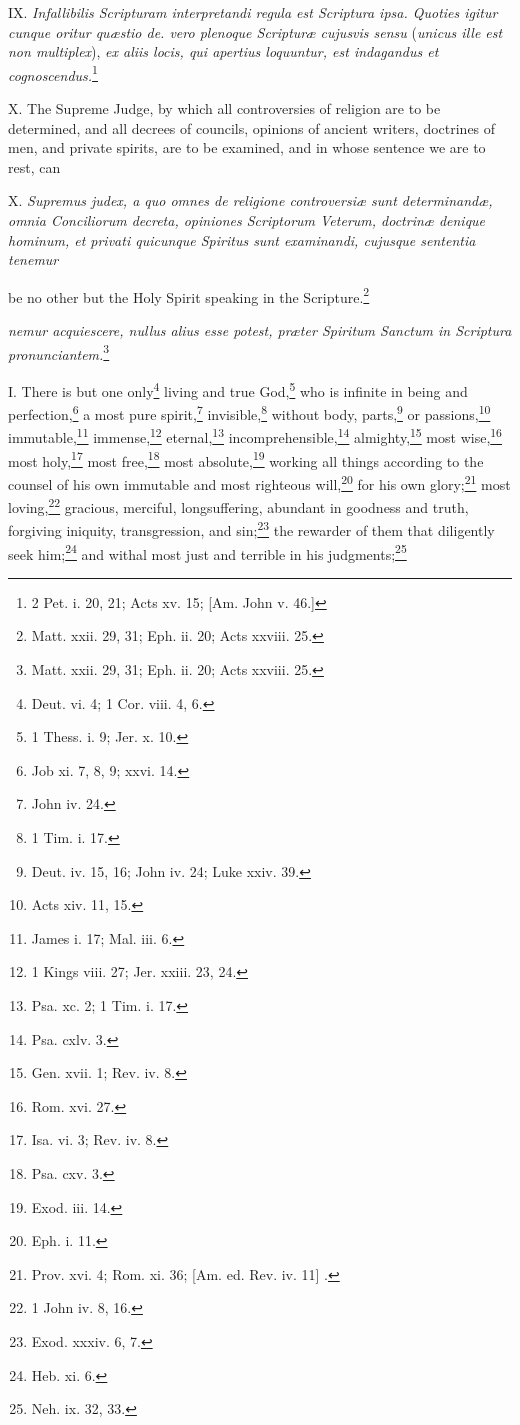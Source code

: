 IX. \emph{Infallibilis Scripturam interpretandi regula est Scriptura ipsa. Quoties igitur cunque oritur quæstio de. vero plenoque Scripturæ cujusvis sensu} (\emph{unicus ille est non multiplex}), \emph{ex aliis locis, qui apertius loquuntur, est indagandus et cognoscendus.}\footnote{2 Pet. i. 20, 21; Acts xv. 15; [Am.  John v. 46.]}

X. The Supreme Judge, by which all controversies of religion are to be determined, and all decrees of councils, opinions of ancient writers, doctrines of men, and private spirits, are to be examined, and in whose sentence we are to rest, can

X. \emph{Supremus judex, a quo omnes de religione controversiæ sunt determinandæ, omnia Conciliorum decreta, opiniones Scriptorum Veterum, doctrinæ denique hominum, et privati quicunque Spiritus sunt examinandi, cujusque sententia tenemur}

be no other but the Holy Spirit speaking in the Scripture.\footnote{Matt. xxii. 29, 31;  Eph. ii. 20; Acts xxviii. 25.}

\emph{nemur acquiescere, nullus alius esse potest, præter Spiritum Sanctum in Scriptura pronunciantem.}\footnote{Matt. xxii. 29, 31; Eph. ii. 20; Acts xxviii. 25.}


I. There is but one only\footnote{Deut. vi. 4;  1 Cor. viii. 4, 6.} living and true God,\footnote{1 Thess. i. 9; Jer. x. 10.} who is infinite in being and perfection,\footnote{Job xi. 7, 8, 9; xxvi. 14.} a most pure spirit,\footnote{John iv. 24.} invisible,\footnote{1 Tim. i. 17.} without body, parts,\footnote{Deut. iv. 15, 16; John iv. 24; Luke xxiv. 39.} or passions,\footnote{Acts xiv. 11, 15.} immutable,\footnote{James i. 17;  Mal. iii. 6.} immense,\footnote{1 Kings viii. 27;  Jer. xxiii. 23, 24.} eternal,\footnote{Psa. xc. 2;  1 Tim. i. 17.} incomprehensible,\footnote{Psa. cxlv. 3.} almighty,\footnote{Gen. xvii. 1;  Rev. iv. 8.} most wise,\footnote{Rom. xvi. 27.} most holy,\footnote{Isa. vi. 3; Rev. iv. 8.} most free,\footnote{Psa. cxv. 3.} most absolute,\footnote{Exod. iii. 14.} working all things according to the counsel of his own immutable and most righteous will,\footnote{Eph. i. 11.} for his own glory;\footnote{Prov. xvi. 4; Rom. xi. 36; [Am. ed. Rev. iv. 11] .} most loving,\footnote{1 John iv. 8, 16.} gracious, merciful, longsuffering, abundant in goodness and truth, forgiving iniquity, transgression, and sin;\footnote{Exod. xxxiv. 6, 7.} the rewarder of them that diligently seek him;\footnote{Heb. xi. 6.} and withal most just and terrible in his judgments;\footnote{Neh. ix. 32, 33.}

